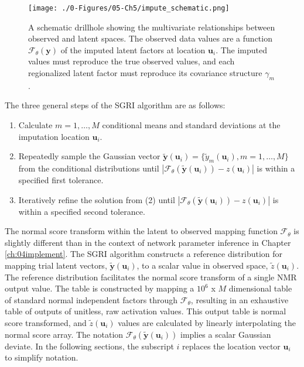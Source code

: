 \begin{figure}[htb!]
    \centering
    \texttt{[image: ./0-Figures/05-Ch5/impute\_schematic.png]}
    \caption{A schematic drillhole showing the multivariate relationships between observed and latent spaces. The observed data values are a function $\mathcal{F}_{\theta}\left(\mathbf{y}\right)$ of the imputed latent factors at location $\mathbf{u}_{i}$. The imputed values must reproduce the true observed values, and each regionalized latent factor must reproduce its covariance structure $\gamma_{m}$. }
    \label{fig:impute_schematic}
\end{figure}

The three general steps of the \gls{SGRI} algorithm are as follows:
\begin{enumerate}[noitemsep]
    \item Calculate $m=1,\dots,M$ conditional means and standard deviations at the imputation location $\mathbf{u}_{i}$.
    \item Repeatedly sample the Gaussian vector $\tilde{\mathbf{y}}(\mathbf{u}_{i}) = \{\tilde{y}_{m}(\mathbf{u}_{i}), m=1,\dots,M \}$ from the conditional distributions until $\left|\mathcal{F}_{\theta}(\tilde{\mathbf{y}}(\mathbf{u}_{i})) - z(\mathbf{u}_{i})\right|$ is within a specified first tolerance.
    \item Iteratively refine the solution from (2) until $\left|\mathcal{F}_{\theta}(\tilde{\mathbf{y}}(\mathbf{u}_{i})) - z(\mathbf{u}_{i})\right|$ is within a specified second tolerance.
\end{enumerate}

The normal score transform within the latent to observed mapping function $\mathcal{F}_{\theta}$ is slightly different than in the context of network parameter inference in Chapter \ref{ch:04implement}. The \gls{SGRI} algorithm constructs a reference distribution for mapping trial latent vectors, $\tilde{\mathbf{y}}(\mathbf{u}_{i})$,  to a scalar value in observed space, $\tilde{z}(\mathbf{u}_{i})$. The reference distribution facilitates the normal score transform of a single NMR output value. The table is constructed by mapping a $10^{6}$ x $M$ dimensional table of standard normal independent factors through  $\mathcal{F}_{\theta}$, resulting in an exhaustive table of outputs of unitless, raw activation values. This output table is normal score transformed, and $\tilde{z}(\mathbf{u}_{i})$ values are calculated by linearly interpolating the normal score array. The notation $\mathcal{F}_{\theta}(\tilde{\mathbf{y}}(\mathbf{u}_{i}))$ implies a scalar Gaussian deviate. In the following sections, the subscript $i$ replaces the location vector $\mathbf{u}_{i}$ to simplify notation.

